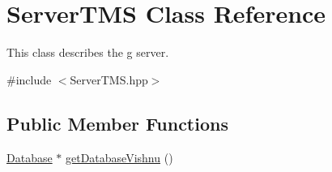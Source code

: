 \hypertarget{classServerTMS}{
\section{ServerTMS Class Reference}
\label{classServerTMS}
}


This class describes the g server.  




{\ttfamily \#include $<$ServerTMS.hpp$>$}

\subsection*{Public Member Functions}
\begin{DoxyCompactItemize}
\item 
\hypertarget{classServerTMS_a1930e69c73d6b558023a105ad5fcc26f}{
\hyperlink{classDatabase}{Database} $\ast$ \hyperlink{classServerTMS_a1930e69c73d6b558023a105ad5fcc26f}{getDatabaseVishnu} ()}
\label{classServerTMS_a1930e69c73d6b558023a105ad5fcc26f}


\end{DoxyCompactItemize}
